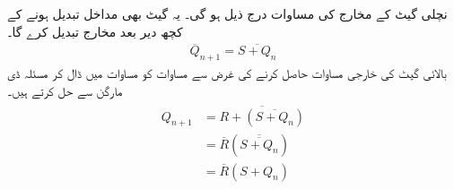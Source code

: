  نچلی گیٹ   کے  مخارج کی مساوات درج ذیل ہو گی۔ یہ گیٹ بھی مداخل  تبدیل ہونے کے کچھ دیر بعد مخارج تبدیل کرے گا۔
 \begin{align}\label{مساوات_ترتیبی_اگلا_متمم_کیو}
 \overline{Q}_{n+1}=\overline{S+Q_n}
 \end{align}
بالائی  گیٹ کی خارجی مساوات حاصل کرنے کی غرض سے مساوات    کو مساوات    میں ڈال کر مسئلہ ڈی مارگن  سے حل کرتے  ہیں۔
\begin{gather}
\begin{aligned}\label{مساوات_ترتیبی_اگلا_کیو_حل}
Q_{n+1}&=\overline{R+(\overline{S+Q_n})}\\
&=\overline{R}(\overline{\overline{S+Q_n}})\\
&=\overline{R}(S+Q_n)
\end{aligned}
\end{gather}


